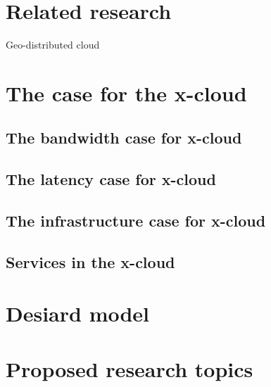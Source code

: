 \documentclass[conference]{IEEEtran}
\newcommand{\xcloud}{x-cloud }
\begin{document}

\section{Related research}

\begin{description}
\item[Geo-distributed cloud] \cite{agarwal2010volley}
\end{description}



\section{The case for the \xcloud}


\subsection{The bandwidth case for \xcloud}


\subsection{The latency case for \xcloud}


\subsection{The infrastructure case for \xcloud}


\subsection{Services in the \xcloud}



\section{Desiard model}



\section{Proposed research topics}






%

\end{document}
